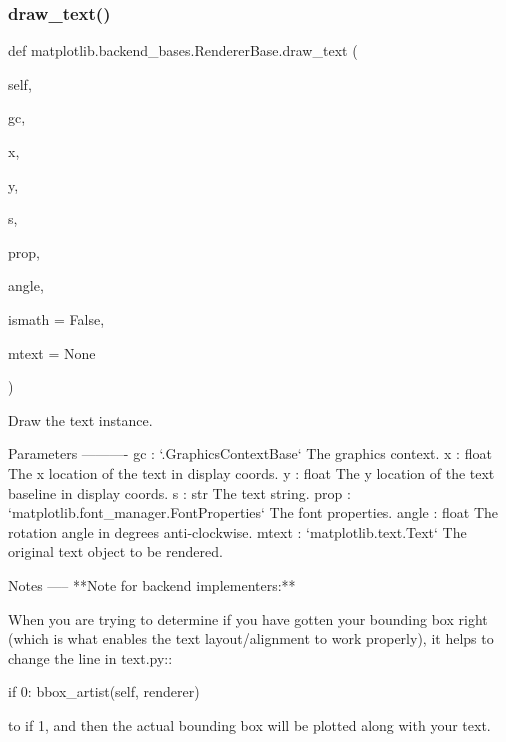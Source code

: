 \begin{DoxyVerb}\end{DoxyVerb}
 \mbox{\label{classmatplotlib_1_1backend__bases_1_1RendererBase_a0ed949a227903d6659e8eb332d29da2d}} 
\subsubsection{\texorpdfstring{draw\+\_\+text()}{draw\_text()}}
{\footnotesize\ttfamily def matplotlib.\+backend\+\_\+bases.\+Renderer\+Base.\+draw\+\_\+text (\begin{DoxyParamCaption}\item[{}]{self,  }\item[{}]{gc,  }\item[{}]{x,  }\item[{}]{y,  }\item[{}]{s,  }\item[{}]{prop,  }\item[{}]{angle,  }\item[{}]{ismath = {\ttfamily False},  }\item[{}]{mtext = {\ttfamily None} }\end{DoxyParamCaption})}

\begin{DoxyVerb}Draw the text instance.

Parameters
----------
gc : `.GraphicsContextBase`
    The graphics context.
x : float
    The x location of the text in display coords.
y : float
    The y location of the text baseline in display coords.
s : str
    The text string.
prop : `matplotlib.font_manager.FontProperties`
    The font properties.
angle : float
    The rotation angle in degrees anti-clockwise.
mtext : `matplotlib.text.Text`
    The original text object to be rendered.

Notes
-----
**Note for backend implementers:**

When you are trying to determine if you have gotten your bounding box
right (which is what enables the text layout/alignment to work
properly), it helps to change the line in text.py::

    if 0: bbox_artist(self, renderer)

to if 1, and then the actual bounding box will be plotted along with
your text.
\end{DoxyVerb}
 \mbox{\label{classmatplotlib_1_1backend__bases_1_1RendererBase_a7dfe1095e947521fe8a6e2f130980699}} 
